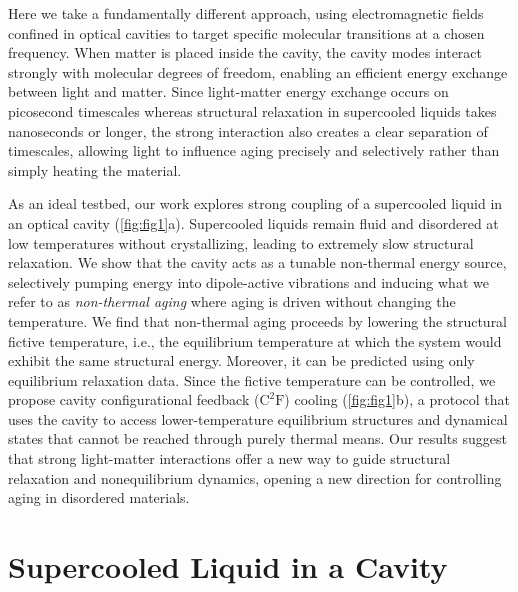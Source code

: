 \documentclass[aps, prl,
 reprint,
 superscriptaddress,
 citeautoscript,
 amsmath,amssymb,
 tightenlines
]{revtex4-2}
\begin{document}
Here we take a fundamentally different approach, using electromagnetic fields confined in optical cavities to target specific molecular transitions at a chosen frequency.\cite{vahala2003optical,aspelmeyer2014cavity} 
When matter is placed inside the cavity, the cavity modes interact strongly with molecular degrees of freedom, enabling an efficient energy exchange between light and matter.\cite{cohen2024atom,cohen2024photons,ebbesen2023introduction,garciavidal2021manipulating,li2022molecular} 
Since light-matter energy exchange occurs on picosecond timescales whereas structural relaxation in supercooled liquids takes nanoseconds or longer, the strong interaction also creates a clear separation of timescales, allowing light to influence aging precisely and selectively rather than simply heating the material.\cite{thomas2016ground,Dunkelberger2022,schlawin2022cavity}

As an ideal testbed, our work explores strong coupling of a supercooled liquid in an optical cavity (\cref{fig:fig1}a). Supercooled liquids remain fluid and disordered at low temperatures without crystallizing, leading to extremely slow structural relaxation. We show that the cavity acts as a tunable non-thermal energy source, selectively pumping energy into dipole-active vibrations and inducing what we refer to as \emph{non-thermal aging} where aging is driven without changing the temperature. 
We find that non-thermal aging proceeds by lowering the structural fictive temperature, i.e., the equilibrium temperature at which the system would exhibit the same structural energy. Moreover, it can be predicted using only equilibrium relaxation data.
Since the fictive temperature can be controlled, we propose cavity configurational feedback ($\mathrm{C^2F}$) cooling (\cref{fig:fig1}b), a protocol that uses the cavity to access lower-temperature equilibrium structures and dynamical states that cannot be reached through purely thermal means. Our results suggest that strong light-matter interactions offer a new way to guide structural relaxation and nonequilibrium dynamics, opening a new direction for controlling aging in disordered materials.

\section*{Supercooled Liquid in a Cavity}
\end{document}
